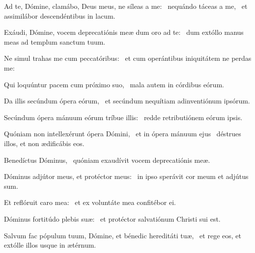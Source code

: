 \item Ad te, Dómine, clamábo, Deus meus, ne síleas a me:~\pscross{} nequándo táceas a me,~\psstar{} et assimilábor descendéntibus in lacum.

\item Exáudi, Dómine, vocem deprecatiónis meæ dum oro ad te:~\psstar{} dum extóllo manus meas ad templum sanctum tuum.

\item Ne simul trahas me cum peccatóribus:~\psstar{} et cum operántibus iniquitátem ne perdas me:

\item Qui loquúntur pacem cum próximo suo,~\psstar{} mala autem in córdibus eórum.

\item Da illis secúndum ópera eórum,~\psstar{} et secúndum nequítiam adinventiónum ipsórum.

\item Secúndum ópera mánuum eórum tríbue illis:~\psstar{} redde retributiónem eórum ipsis.

\item Quóniam non intellexérunt ópera Dómini,~\pscross{} et in ópera mánuum ejus~\psstar{} déstrues illos, et non ædificábis eos.

\item Benedíctus Dóminus,~\psstar{} quóniam exaudívit vocem deprecatiónis meæ.

\item Dóminus adjútor meus, et protéctor meus:~\psstar{} in ipso sperávit cor meum et adjútus sum.

\item Et reflóruit caro mea:~\psstar{} et ex voluntáte mea confitébor ei.

\item Dóminus fortitúdo plebis suæ:~\psstar{} et protéctor salvatiónum Christi sui est.

\item Salvum fac pópulum tuum, Dómine, et bénedic hereditáti tuæ,~\psstar{} et rege eos, et extólle illos usque in ætérnum.